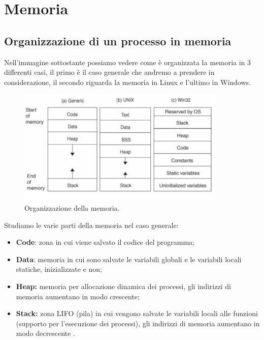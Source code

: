 \section{Memoria}

\subsection{Organizzazione di un processo in memoria}

Nell'immagine sottostante possiamo vedere come è organizzata la memoria in 3
differenti casi, il primo è il caso generale che andremo a prendere in considerazione,
il secondo riguarda la memoria in Linux e l'ultimo in Windows.

\begin{figure}[H]
    \centering
    \includegraphics[width=10cm, keepaspectratio]{capitoli/secure_coding/img/cap_2/memoria.png}
    \caption{Organizzazione della memoria.}\label{fig:org_memoria}
\end{figure}

Studiamo le varie parti della memoria nel caso generale:

\begin{itemize}
    \item \textbf{Code}: zona in cui viene salvato il codice del programma;
    \item \textbf{Data}: memoria  in cui sono salvate le variabili globali e le
          variabili locali statiche, inizializzate e non;
    \item \textbf{Heap:} memoria per allocazione dinamica dei processi, gli indirizzi
          di memoria aumentano in modo crescente;
    \item \textbf{Stack:} zona LIFO (pila) in cui vengono salvate le variabili locali
          alle funzioni (supporto per l'esecuzione dei processi), gli indirizzi di memoria
          aumentano in modo decrescente .
\end{itemize}

